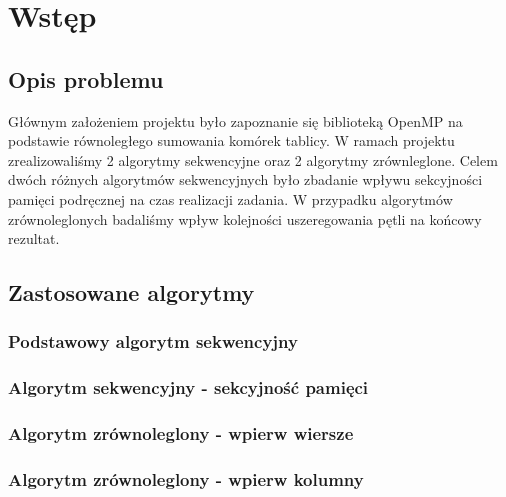 \section{Wstęp}

\subsection{Opis problemu}

Głównym założeniem projektu było zapoznanie się biblioteką OpenMP na podstawie równoległego sumowania komórek tablicy. W ramach projektu zrealizowaliśmy 2 algorytmy sekwencyjne oraz 2 algorytmy zrównleglone. Celem dwóch różnych algorytmów sekwencyjnych było zbadanie wpływu sekcyjności pamięci podręcznej na czas realizacji zadania. W przypadku algorytmów zrównoleglonych badaliśmy wpływ kolejności uszeregowania pętli na końcowy rezultat.

\subsection{Zastosowane algorytmy}

\subsubsection{Podstawowy algorytm sekwencyjny}

\subsubsection{Algorytm sekwencyjny - sekcyjność pamięci}

\subsubsection{Algorytm zrównoleglony - wpierw wiersze}

\subsubsection{Algorytm zrównoleglony - wpierw kolumny}